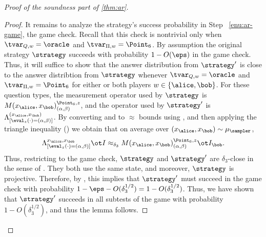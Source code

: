 \begin{proof}[Proof of the soundness part of \cref{thm:ar}]
\begin{proof}
  It remains to analyze the strategy's success probability
  in Step ~\ref{enu:ar-game}, the game check. Recall that this check
  is nontrivial only when $\tvar_{Q,w} = \oracle$ and $\tvar_{\Pi,w} =
  \Point_6$. By assumption the original strategy $\strategy$ succeeds with
  probability $1-O(\eps)$ in the game check. Thus, it will suffice to
  show that the answer distribution from $\strategy'$ is close to the
  answer distribtion from $\strategy$ whenever $\tvar_{Q,w} = \oracle$
  and $\tvar_{\Pi,w} = \Point_6$ for either or both players $w \in
  \{\alice, \bob\}$. For these question types, the measurement
  operator used by $\strategy$ is $M(x_\alice, x_\bob)^{\Point_6,
    z}_{(\alpha, \beta)}$, and
  the operator used by $\strategy'$ is $\Lambda^{(x_\alice,
    x_\bob)}_{[\eval_z(\cdot) = (\alpha, \beta)]}$. By converting
   and  to
  $\approx$ bounds using , and then applying the
  triangle inequality () we obtain
  that on average over $(x_\alice, x_\bob) \sim \mu_\sampler$,
  \[ \Lambda^{x_\alice, x_\bob}_{[\eval_{z}(\cdot) = (\alpha, \beta)]}
    \ot I \approx_{\delta_3} M(x_\alice,
    x_\bob)^{\Point_6, z}_{(\alpha, \beta)} \ot I_{\bob}. \]
  Thus, restricting to the game check, $\strategy$ and $\strategy'$
  are $\delta_3$-close in the sense of
  . They both use the same state, and
  moreover, $\strategy$ is projective. Therefore, by , this implies that $\strategy'$ must
  succeed in the game check with probability $1 - \eps -
  O(\delta_3^{1/2}) = 1 - O(\delta_3^{1/2})$.  
  Thus, we have shown that $\strategy'$ succeeds in all subtests of the
  game with probability $1 - O(\delta_3^{1/2})$, and thus the lemma follows.
\end{proof}


\end{proof}
